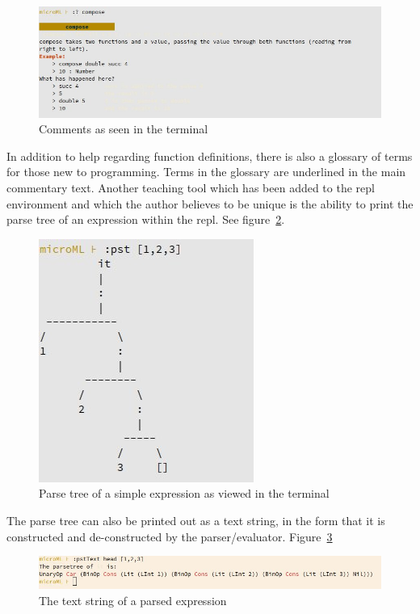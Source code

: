 \documentclass[12pt, a4paper]{report}
\begin{document}
\begin{figure}
    \includegraphics[width=\textwidth]{images/comment.jpg}
    {\caption{Comments as seen in the terminal}}
\label{fig:comments}
\end{figure}

In addition to help regarding function definitions, there is also a glossary of terms for those new
to programming. Terms in the glossary are underlined in the main commentary text.  Another teaching 
tool which has been added to the repl environment and which the author believes to be unique
is the ability to print the parse tree of an expression within the repl. See figure~\ref{fig:tree}.

\begin{figure}
    \includegraphics[scale=0.6]{images/tree.jpg}
    {\caption{Parse tree of a simple expression as viewed in the terminal}}
\label{fig:tree}
\end{figure}

The parse tree can also be printed out as a text string, in the form that it is constructed and
de-constructed by the parser/evaluator. Figure~\ref{fig:parsetext}

\begin{figure}
    \includegraphics[width=\textwidth]{images/parsetext.jpg}
    {\caption{The text string of a parsed expression}}
    \label{fig:parsetext}
\end{figure}
\end{document}
